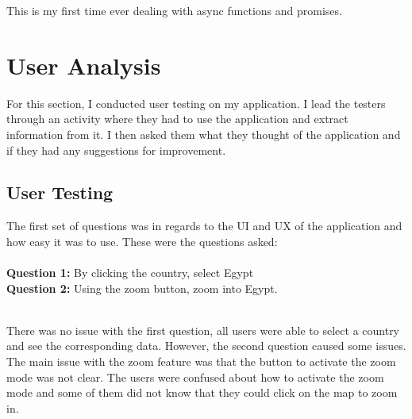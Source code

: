 \documentclass{report}
\begin{document}
This is my first time ever dealing with async functions and promises.

\chapter{User Analysis}
For this section, I conducted user testing on my application. I lead the testers through an activity where they had to use the application and extract information from it. I then asked them what they thought of the application and if they had any suggestions for improvement.
\section{User Testing}
The first set of questions was in regards to the UI and UX of the application and how easy it was to use. These were the questions asked:\\ \\
\textbf{Question 1: }By clicking the country, select Egypt\\
\textbf{Question 2: }Using the zoom button, zoom into Egypt.\\

\noindent
\begin{minipage}[t]{0.45\textwidth}
    \centering
\end{minipage}
\hfill
\begin{minipage}[t]{0.45\textwidth}
    \centering
\end{minipage}
\newline
\\There was no issue with the first question, all users were able to select a country and see the corresponding data. However, the second question caused some issues. The main issue with the zoom feature was that the button to activate the zoom mode was not clear. The users were confused about how to activate the zoom mode and some of them did not know that they could click on the map to zoom in.
\end{document}
